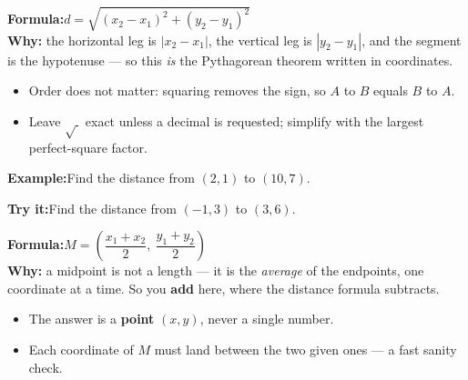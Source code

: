 \documentclass[12pt]{article}
\begin{document}


\begin{formulabox}
\textbf{Formula:}\quad $d = \sqrt{(x_2 - x_1)^2 + (y_2 - y_1)^2}$\\[3pt]
\textbf{Why:} the horizontal leg is $|x_2 - x_1|$, the vertical leg is $|y_2 - y_1|$,
and the segment is the hypotenuse --- so this \emph{is} the Pythagorean theorem written
in coordinates.
\begin{itemize}[leftmargin=0.8cm, itemsep=0pt, topsep=2pt]
  \item Order does not matter: squaring removes the sign, so $A$ to $B$ equals $B$ to $A$.
  \item Leave $\sqrt{\ }$ exact unless a decimal is requested; simplify with the largest perfect-square factor.
\end{itemize}
\end{formulabox}

\begin{examplebox}
\textbf{Example:}\quad Find the distance from $(2, 1)$ to $(10, 7)$.
\end{examplebox}

\begin{tryitbox}
\textbf{Try it:}\quad Find the distance from $(-1, 3)$ to $(3, 6)$.\\[2pt]
\end{tryitbox}


\begin{formulabox}
\textbf{Formula:}\quad $M = \left( \dfrac{x_1 + x_2}{2},\ \dfrac{y_1 + y_2}{2} \right)$\\[3pt]
\textbf{Why:} a midpoint is not a length --- it is the \emph{average} of the endpoints,
one coordinate at a time. So you \textbf{add} here, where the distance formula subtracts.
\begin{itemize}[leftmargin=0.8cm, itemsep=0pt, topsep=2pt]
  \item The answer is a \textbf{point} $(x, y)$, never a single number.
  \item Each coordinate of $M$ must land between the two given ones --- a fast sanity check.
\end{itemize}
\end{formulabox}
\end{document}
